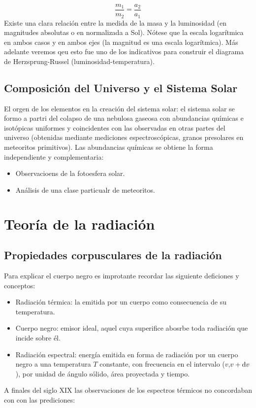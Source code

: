 \begin{equation*}
    \frac{m_1}{m_2} = \frac{a_2}{a_1}
\end{equation*}
Existe una clara relación entre la medida de la masa y la luminosidad (en magnitudes absolutas o en normalizada a Sol). Nótese que la escala logarítmica en ambos casos y en ambos ejes (la magnitud es una escala logarítmica). Más adelante veremos qeu esto fue uno de los indicativos para construir el diagrama de Herzsprung-Russel (luminosidad-temperatura).

\subsection{Composición del Universo y el Sistema Solar}

El orgen de los elementos en la creación del sistema solar: el sistema solar se formo a partri del colapso de una nebulosa gaseosa con abundancias químicas e isotópicas uniformes y coincidentes con las observadas en otras partes del universo (obtenidas mediante mediciones espectroscópicas, granos presolares en meteoritos primitivos). Las abundancias químicas se obtiene la forma independiente y complementaria:

\begin{itemize}
    \item Observacioens de la fotoesfera solar.
    \item Análisis de una clase particualr de meteoritos.
\end{itemize}





\section{Teoría de la radiación}

\subsection{Propiedades corpusculares de la radiación}

Para explicar el cuerpo negro es improtante recordar las siguiente deficiones y conceptos: 

\begin{itemize}
    \item Radiación térmica: la emitida por un cuerpo como consecuencia de su temperatura.
    \item Cuerpo negro: emisor ideal, aquel cuya superifice abosrbe toda radiación que incide sobre él.
    \item Radiación espectral: energía emitida en forma de radiación por un cuerpo negro a una temperatura $T$ constante, con frecuencia en el intervalo ($v$,$v+\mathrm{d} v$), por unidad de ángulo sólido, área proyectada y tiempo. 
\end{itemize}
A finales del siglo XIX las observaciones de los espectros térmicos no concordaban con con las prediciones:

